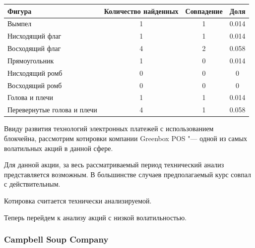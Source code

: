 \documentclass[bachelor, och, coursework]{SCWorks}
\begin{document}
    \begin{table}[!hbt]
        \centering
        \begin{tabular}{|l|c|c|c|}
        \hline
        Фигура                      & \multicolumn{1}{l|}{Количество найденных} & Совпадение & Доля  \\ \hline
        Вымпел                      & 1                                         & 1          & 0.014 \\ \hline
        Нисходящий флаг             & 1                                         & 1          & 0.014 \\ \hline
        Восходящий флаг             & 4                                         & 2          & 0.058 \\ \hline
        Прямоугольник               & 1                                         & 0          & 0.014 \\ \hline
        Нисходящий ромб             & 0                                         & 0          & 0     \\ \hline
        Восходящий ромб             & 0                                         & 0          & 0     \\ \hline
        Голова и плечи              & 1                                         & 1          & 0.014 \\ \hline
        Перевернутые голова и плечи & 4                                         & 1          & 0.058 \\ \hline
        \end{tabular}
        \end{table}

    Ввиду развития технологий электронных платежей с использованием \\блокчейна,
    рассмотрим котировки компании Greenbox POS "--- одной из самых волатильных 
    акций в данной сфере.

    Для данной акции, за весь рассматриваемый период технический анализ 
    представляется возможным. В большинстве случаев предполагаемый курс совпал с 
    действительным.
    
    Котировка считается технически анализируемой.

    Теперь перейдем к анализу акций с низкой волатильностью.

    \subsubsection{Campbell Soup Company}
    
\end{document}
